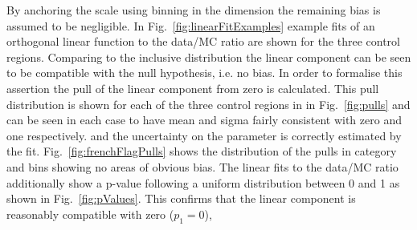 By anchoring the scale using binning in the \scalht dimension the remaining
bias is assumed to be negligible. In Fig.~\ref{fig:linearFitExamples} 
example fits of an orthogonal linear function to the data/MC ratio 
are shown for the three control regions. Comparing to the inclusive distribution 
the linear component can be seen to be compatible with the null hypothesis, 
i.e. no bias. In order to formalise this assertion 
the pull of the linear component from zero is calculated.
This pull distribution is shown for each of the three control regions in
in Fig.~\ref{fig:pulls} and can be seen in each case to have mean and sigma fairly 
consistent with zero and one respectively. 
and the uncertainty on the parameter is correctly estimated by the fit.
Fig.~\ref{fig:frenchFlagPulls} shows the distribution of the pulls 
in category and \scalht bins showing no areas of obvious bias.
The linear fits to the data/MC ratio additionally show a p-value following 
a uniform distribution between 0 and 1 as shown in Fig.~\ref{fig:pValues}.
This confirms that the linear component is reasonably compatible with zero ($p_1 = 0$), %


